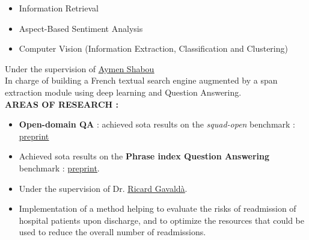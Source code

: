 \documentclass[]{deedy-resume-openfont}
\begin{document}
\begin{minipage}[t]{0.66\textwidth}
\begin{itemize}
\end{itemize}

\begin{itemize}
    \item Information Retrieval
    \item Aspect-Based Sentiment Analysis
    \item Computer Vision (Information Extraction, Classification and Clustering)
\end{itemize}

\vspace{5pt}

\vspace{5pt}
Under the supervision of {\href{https://fr.linkedin.com/in/aymen-shabou}{\underline{Aymen Shabou}}}\\
\vspace{5pt}
In charge of building a French textual search engine augmented by a span extraction module using deep learning and Question Answering.\\
\vspace{3pt}
\textbf{AREAS OF RESEARCH : }
\begin{itemize}
    \item \textbf{Open-domain QA} : achieved sota results on the \textit{squad-open} benchmark : \href{https://arxiv.org/abs/2012.09766}{\underline{preprint}}
    
    \item Achieved sota results on the \textbf{Phrase index Question Answering} benchmark :  \href{https://arxiv.org/abs/2101.02157}{\underline{preprint}}. 

\end{itemize} 

\vspace{10pt}

\begin{itemize}
    \item Under the supervision of Dr. \href{https://www.cs.upc.edu/~gavalda/}{\underline{Ricard Gavaldà}}.
    \item Implementation of a method helping to evaluate the risks of readmission of hospital patients upon discharge, and to optimize the resources that could be used to reduce the overall number of readmissions. 
\end{itemize}  

\end{minipage} 
\end{document}
